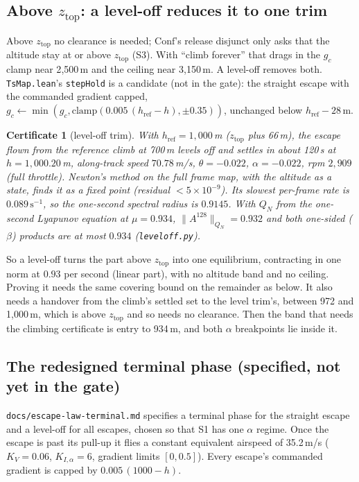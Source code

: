 \documentclass[11pt]{article}
\newtheorem{cert}{Certificate}
\newcommand{\Conf}{\ensuremath{\mathrm{Conf}}}
\newcommand{\zTop}{z_{\mathrm{top}}}
\begin{document}
\subsection{Above $\zTop$: a level-off reduces it to one trim}\label{sec:leveloff}

Above $\zTop$ no clearance is needed; $\Conf$'s release disjunct only asks that the altitude stay at or above $\zTop$ (S3). With ``climb forever'' that drags in the $g_c$ clamp near 2{,}500\,m and the ceiling near 3{,}150\,m. A level-off removes both. \texttt{TsMap.lean}'s \texttt{stepHold} is a candidate (not in the gate): the straight escape with the commanded gradient capped, $g_c \leftarrow \min(g_c, \mathrm{clamp}(0.005\,(h_{\mathrm{ref}} - h), \pm 0.35))$, unchanged below $h_{\mathrm{ref}} - 28$\,m.

\begin{cert}[level-off trim]\label{cert:level}
With $h_{\mathrm{ref}} = 1{,}000$\,m ($\zTop$ plus 66\,m), the escape flown from the reference climb at 700\,m levels off and settles in about 120\,s at $h = 1{,}000.20$\,m, along-track speed $70.78$\,m/s, $\theta = -0.022$, $\alpha = -0.022$, rpm $2{,}909$ (full throttle). Newton's method on the full frame map, with the altitude as a state, finds it as a fixed point (residual $< 5\times10^{-9}$). Its slowest per-frame rate is $0.089\,\mathrm{s}^{-1}$, so the one-second spectral radius is $0.9145$. With $Q_N$ from the one-second Lyapunov equation at $\mu = 0.934$, $\|A^{128}\|_{Q_N} = 0.932$ and both one-sided ($\beta$) products are at most $0.934$ (\texttt{leveloff.py}).
\end{cert}

So a level-off turns the part above $\zTop$ into one equilibrium, contracting in one norm at $0.93$ per second (linear part), with no altitude band and no ceiling. Proving it needs the same covering bound on the remainder as below. It also needs a handover from the climb's settled set to the level trim's, between 972 and 1{,}000\,m, which is above $\zTop$ and so needs no clearance. Then the band that needs the climbing certificate is entry to 934\,m, and both $\alpha$ breakpoints lie inside it.

\subsection{The redesigned terminal phase (specified, not yet in the gate)}\label{sec:newlaw}

\texttt{docs/escape-law-terminal.md} specifies a terminal phase for the straight escape and a level-off for all escapes, chosen so that S1 has one $\alpha$ regime. Once the escape is past its pull-up it flies a constant equivalent airspeed of 35.2\,m/s ($K_V = 0.06$, $K_{I,\alpha} = 6$, gradient limits $[0, 0.5]$). Every escape's commanded gradient is capped by $0.005\,(1000 - h)$.
\end{document}

